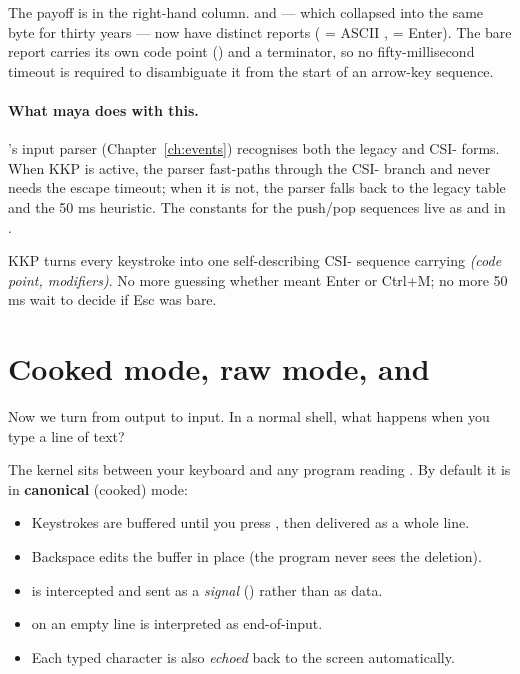 The payoff is in the right-hand column.  and
 --- which collapsed into the same byte for thirty
years --- now have distinct reports ( = ASCII ,
 = Enter). The bare  report carries its own
code point () and a  terminator, so no
fifty-millisecond timeout is required to disambiguate it from the
start of an arrow-key sequence.

\paragraph{What maya does with this.}
\maya{}'s input parser (Chapter~\ref{ch:events}) recognises both the
legacy and CSI- forms. When KKP is active, the parser fast-paths
through the CSI- branch and never needs the escape timeout;
when it is not, the parser falls back to the legacy table and the
50 ms heuristic. The constants for the push/pop sequences live as
 and  in
.

\begin{idea}
KKP turns every keystroke into one self-describing CSI-
sequence carrying \emph{(code point, modifiers)}. No more guessing
whether  meant Enter or Ctrl+M; no more 50 ms wait to
decide if Esc was bare.
\end{idea}

\section{Cooked mode, raw mode, and }

Now we turn from output to input. In a normal shell, what happens
when you type a line of text?

The kernel sits between your keyboard and any program reading
. By default it is in \textbf{canonical} (cooked) mode:

\begin{itemize}[leftmargin=*]
  \item Keystrokes are buffered until you press , then
    delivered as a whole line.
  \item Backspace edits the buffer in place (the program never sees
    the deletion).
  \item {} is intercepted and sent as a \emph{signal}
    () rather than as data.
  \item {} on an empty line is interpreted as
    end-of-input.
  \item Each typed character is also \emph{echoed} back to the
    screen automatically.
\end{itemize}

